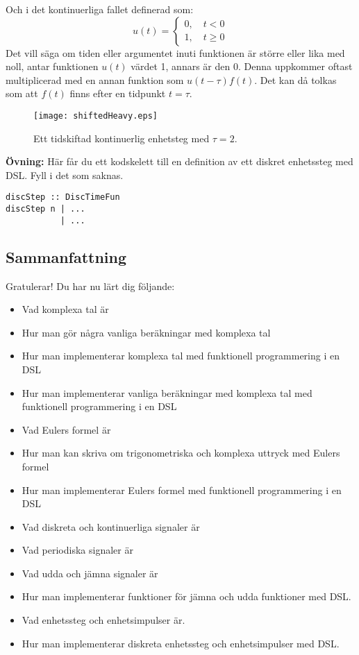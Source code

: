\documentclass{article}
\begin{document}
Och i det kontinuerliga fallet definerad som:
$$
u(t) =
\begin{cases}
0, \quad t < 0 \\
1, \quad t \geq 0
\end{cases}
$$
Det vill säga om tiden eller argumentet inuti funktionen är större eller lika med noll, antar funktionen $u(t)$ värdet 1, annars är den 0. Denna uppkommer oftast multiplicerad med en annan funktion som $u(t-\tau) f(t)$. Det kan då tolkas som att $f(t)$ finns efter en tidpunkt $t = \tau$.

\begin{figure}[ht]
\centerline{\texttt{[image: shiftedHeavy.eps]}}
\caption{Ett tidskiftad kontinuerlig enhetsteg med $\tau = 2$.}
\label{}
\end{figure}

\textbf{Övning:} Här får du ett kodskelett till en definition av ett diskret enhetssteg med DSL. Fyll i det som saknas.
\begin{verbatim}
discStep :: DiscTimeFun
discStep n | ...
           | ...
\end{verbatim}
\newpage
\subsection{Sammanfattning}
Gratulerar! Du har nu lärt dig följande:
\begin{itemize}
\item Vad komplexa tal är
\item Hur man gör några vanliga beräkningar med komplexa tal
\item Hur man implementerar komplexa tal med funktionell programmering i en DSL
\item Hur man implementerar vanliga beräkningar med komplexa tal med funktionell programmering i en DSL
\item Vad Eulers formel är
\item Hur man kan skriva om trigonometriska och komplexa uttryck med Eulers formel
\item Hur man implementerar Eulers formel med funktionell programmering i en DSL
\item Vad diskreta och kontinuerliga signaler är
\item Vad periodiska signaler är
\item Vad udda och jämna signaler är
\item Hur man implementerar funktioner för jämna och udda funktioner med DSL.
\item Vad enhetssteg och enhetsimpulser är.
\item Hur man implementerar diskreta enhetssteg och enhetsimpulser med DSL.
\end{itemize}
\end{document}
